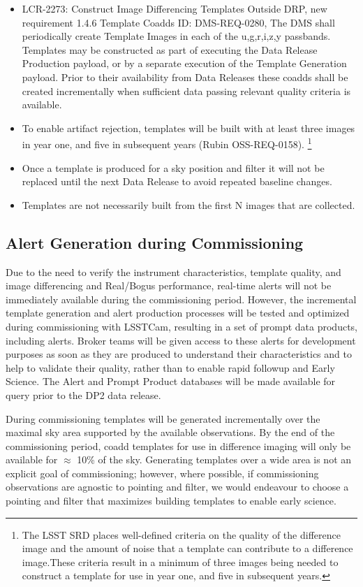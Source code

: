 \begin{itemize} 
\item LCR-2273: Construct Image Differencing Templates Outside DRP, new requirement 1.4.6 Template Coadds ID: DMS-REQ-0280, The DMS shall periodically create Template Images in each of the u,g,r,i,z,y passbands. Templates may be constructed as part of executing the Data Release Production payload, or by a separate execution of the Template Generation payload. Prior to their availability from Data Releases these coadds shall be created incrementally when sufficient data passing relevant quality criteria is available. 
\item To enable artifact rejection, templates will be built with at least three images in year one, and five in subsequent years (Rubin OSS-REQ-0158). \footnote{The LSST SRD places well-defined criteria on the quality of the difference image and the amount of noise that a template can contribute to a difference image.These criteria result in a minimum of three images being needed to construct a template for use in year one, and five in subsequent years.}
\item Once a template is produced for a sky position and filter it will not be replaced until the next Data Release to avoid repeated baseline changes.
\item Templates are not necessarily built from the first N images that are collected.
\end{itemize}


\subsection{Alert Generation during Commissioning}

Due to the need to verify the instrument characteristics, template quality, and image differencing and Real/Bogus performance, real-time alerts will not be immediately available during the commissioning period.
However, the incremental template generation and alert production processes will be tested and optimized during commissioning with LSSTCam, resulting in a set of prompt data products, including alerts.
Broker teams will be given access to these alerts for development purposes as soon as they are produced to understand their characteristics and to help to validate their quality, rather than to enable rapid followup and Early Science. 
The Alert and Prompt Product databases will be made available for query prior to the DP2 data release.

During commissioning templates will be generated incrementally over the maximal sky area supported by the available observations.
By the end of the commissioning period, coadd templates for use in difference imaging will only be available for $\approx$ 10\% of the sky.
Generating templates over a wide area is not an explicit goal of commissioning;  however, where possible, if commissioning observations are agnostic to pointing and filter, we would endeavour to choose a pointing and filter that maximizes building templates to enable early science.

